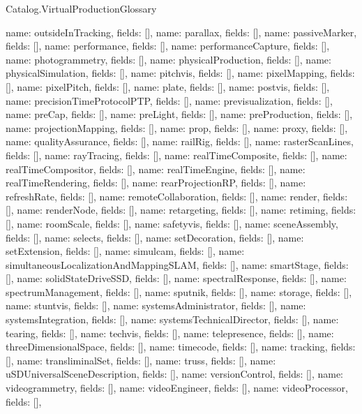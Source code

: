 \begin{lexlean}{Catalog.VirtualProductionGlossary}
\begin{semanticmodule}
{    {name: outsideInTracking, fields: []},
    {name: parallax, fields: []},
    {name: passiveMarker, fields: []},
    {name: performance, fields: []},
    {name: performanceCapture, fields: []},
    {name: photogrammetry, fields: []},
    {name: physicalProduction, fields: []},
    {name: physicalSimulation, fields: []},
    {name: pitchvis, fields: []},
    {name: pixelMapping, fields: []},
    {name: pixelPitch, fields: []},
    {name: plate, fields: []},
    {name: postvis, fields: []},
    {name: precisionTimeProtocolPTP, fields: []},
    {name: previsualization, fields: []},
    {name: preCap, fields: []},
    {name: preLight, fields: []},
    {name: preProduction, fields: []},
    {name: projectionMapping, fields: []},
    {name: prop, fields: []},
    {name: proxy, fields: []},
    {name: qualityAssurance, fields: []},
    {name: railRig, fields: []},
    {name: rasterScanLines, fields: []},
    {name: rayTracing, fields: []},
    {name: realTimeComposite, fields: []},
    {name: realTimeCompositor, fields: []},
    {name: realTimeEngine, fields: []},
    {name: realTimeRendering, fields: []},
    {name: rearProjectionRP, fields: []},
    {name: refreshRate, fields: []},
    {name: remoteCollaboration, fields: []},
    {name: render, fields: []},
    {name: renderNode, fields: []},
    {name: retargeting, fields: []},
    {name: retiming, fields: []},
    {name: roomScale, fields: []},
    {name: safetyvis, fields: []},
    {name: sceneAssembly, fields: []},
    {name: selects, fields: []},
    {name: setDecoration, fields: []},
    {name: setExtension, fields: []},
    {name: simulcam, fields: []},
    {name: simultaneousLocalizationAndMappingSLAM, fields: []},
    {name: smartStage, fields: []},
    {name: solidStateDriveSSD, fields: []},
    {name: spectralResponse, fields: []},
    {name: spectrumManagement, fields: []},
    {name: sputnik, fields: []},
    {name: storage, fields: []},
    {name: stuntvis, fields: []},
    {name: systemsAdministrator, fields: []},
    {name: systemsIntegration, fields: []},
    {name: systemsTechnicalDirector, fields: []},
    {name: tearing, fields: []},
    {name: techvis, fields: []},
    {name: telepresence, fields: []},
    {name: threeDimensionalSpace, fields: []},
    {name: timecode, fields: []},
    {name: tracking, fields: []},
    {name: transliminalSet, fields: []},
    {name: truss, fields: []},
    {name: uSDUniversalSceneDescription, fields: []},
    {name: versionControl, fields: []},
    {name: videogrammetry, fields: []},
    {name: videoEngineer, fields: []},
    {name: videoProcessor, fields: []},
}
\end{semanticmodule}
\end{lexlean}
